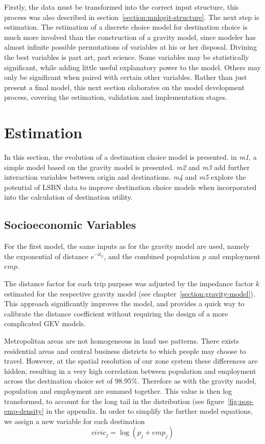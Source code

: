 Firstly, the data must be transformed into the correct input structure, this process was also described in section~\ref{section:mnlogit-structure}. The next step is estimation. The estimation of a discrete choice model for destination choice is much more involved than the construction of a gravity model, since modeler has almost infinite possible permutations of variables at his or her disposal. Divining the best variables is part art, part science. Some variables may be statistically significant, while adding little useful explanatory power to the model. Others may only be significant when paired with certain other variables. Rather than just present a final model, this next section elaborates on the model development process, covering the estimation, validation and implementation stages.

\section{Estimation}
\label{section:estimation}
In this section, the evolution of a destination choice model is presented. in \textit{m1}, a simple model based on the gravity model is presented. \textit{m2} and \textit{m3} add further interaction variables between origin and destinations. \textit{m4} and \textit{m5} explore the potential of LSBN data to improve destination choice models when incorporated into the calculation of destination utility.

\subsection{Socioeconomic Variables}
For the first model, the same inputs as for the gravity model are used, namely the exponential of distance $e^{-d_{ij}}$, and the combined population $p$ and employment $emp$.

The distance factor for each trip purpose was adjusted by the impedance factor $k$ estimated for the respective gravity model (see chapter~\ref{section:gravity-model}). This approach significantly improves the model, and provides a quick way to calibrate the distance coefficient without requiring the design of a more complicated GEV models.

Metropolitan areas are not homogeneous in land use patterns. There exists residential areas and central business districts to which people may choose to travel. However, at the spatial resolution of our zone system these differences are hidden, resulting in a very high correlation between population and employment across the destination choice set of 98.95\%. Therefore as with the gravity model, population and employment are summed together. This value is  then log transformed, to account for the long tail in the distribution (see figure~\ref{fig:pop-emp-density} in the appendix. In order to simplify the further model equations, we assign a new variable for each destination
$$ civic_j = \log\left( p_j + emp_j \right) $$

